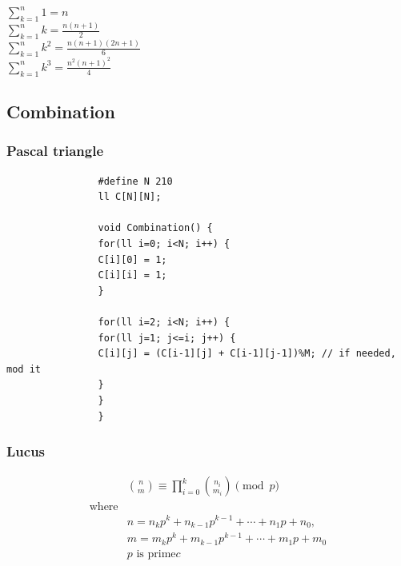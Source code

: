 \documentclass[10pt,oneside]{article}
\begin{document}
\begin{landscape}
\begin{multicols}{2}
				{\normalsize 
					$\sum_{k=1}^{n} 1= n$\\
					$\sum_{k=1}^{n} k= \frac{n(n+1)}{2}$\\
					$\sum_{k=1}^{n} k^2= \frac{n(n+1)(2n+1)}{6}$\\
					$\sum_{k=1}^{n} k^3= \frac{n^2(n+1)^2}{4}$\\
				}
				
				
				\subsection{Combination}
				
				\subsubsection{Pascal triangle}
				
				\begin{verbatim}
				#define N 210
				ll C[N][N];
				
				void Combination() {
				for(ll i=0; i<N; i++) {
				C[i][0] = 1;
				C[i][i] = 1;
				}
				
				for(ll i=2; i<N; i++) {
				for(ll j=1; j<=i; j++) {
				C[i][j] = (C[i-1][j] + C[i-1][j-1])%M; // if needed, mod it
				}
				}
				}
				\end{verbatim}
				
				\subsubsection{Lucus}
				
				\begin{equation}
				\begin{split}&\binom{n}{m} \equiv \prod_{i=0}^k \binom{n_i}{m_i} \pmod p \\
				\text{where}& \\
				&n = n_kp^k+n_{k-1}p^{k-1}+\cdots +n_1p+n_0, \\
				&m = m_kp^k+m_{k-1}p^{k-1}+\cdots +m_1p+m_0 \\
				&p \text{ is prime}
				c\end{split}
				\end{equation}
				

\end{multicols}
\end{landscape}
\end{document}
